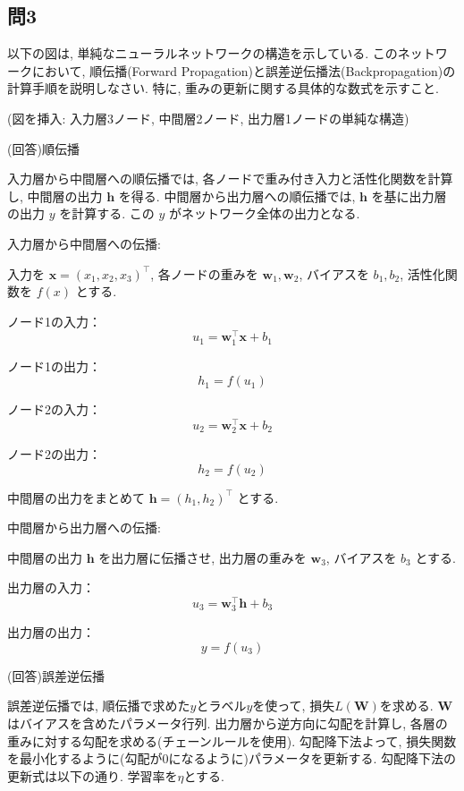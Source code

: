 \documentclass[dvipdfmx, 10pt]{jsarticle}
\begin{document}
\subsection*{問3}
以下の図は, 単純なニューラルネットワークの構造を示している. このネットワークにおいて, 順伝播(Forward Propagation)と誤差逆伝播法(Backpropagation)の計算手順を説明しなさい. 特に, 重みの更新に関する具体的な数式を示すこと. 

\begin{center}
(図を挿入: 入力層3ノード, 中間層2ノード, 出力層1ノードの単純な構造)
\end{center}

(回答)順伝播

入力層から中間層への順伝播では, 各ノードで重み付き入力と活性化関数を計算し, 中間層の出力 $\mathbf{h}$ を得る. 
中間層から出力層への順伝播では, $\mathbf{h}$ を基に出力層の出力 $y$ を計算する. 
この $y$ がネットワーク全体の出力となる. 

\begin{framed}
入力層から中間層への伝播: 

入力を $\mathbf{x} = (x_1, x_2, x_3)^{\top}$, 各ノードの重みを $\mathbf{w}_1, \mathbf{w}_2$, バイアスを $b_1, b_2$, 活性化関数を $f(x)$ とする. 

ノード1の入力：
\[
u_1 = \mathbf{w}_1^{\top} \mathbf{x} + b_1
\]

ノード1の出力：
\[
h_1 = f(u_1)
\]

ノード2の入力：
\[
u_2 = \mathbf{w}_2^{\top} \mathbf{x} + b_2
\]

ノード2の出力：
\[
h_2 = f(u_2)
\]

中間層の出力をまとめて $\mathbf{h} = (h_1, h_2)^{\top}$ とする. 

中間層から出力層への伝播:

中間層の出力 $\mathbf{h}$ を出力層に伝播させ, 出力層の重みを $\mathbf{w}_3$, バイアスを $b_3$ とする. 

出力層の入力：
\[
u_3 = \mathbf{w}_3^{\top} \mathbf{h} + b_3
\]

出力層の出力：
\[
y = f(u_3)
\]
\end{framed}

(回答)誤差逆伝播

誤差逆伝播では, 順伝播で求めた$\hat{y}$とラベル$y$を使って, 損失$L(\mathbf{W})$を求める. $\mathbf{W}$はバイアスを含めたパラメータ行列. 
出力層から逆方向に勾配を計算し, 各層の重みに対する勾配を求める(チェーンルールを使用). 
勾配降下法よって, 損失関数を最小化するように(勾配が$0$になるように)パラメータを更新する. 
勾配降下法の更新式は以下の通り. 学習率を$\eta$とする. 
\end{document}
